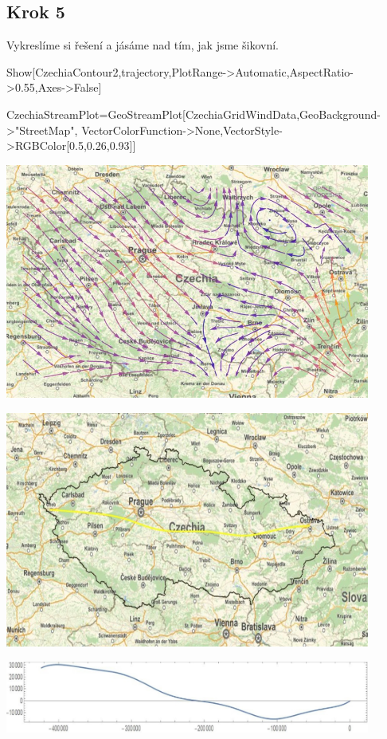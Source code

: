 \documentclass[reqno, a4paper]{amsart}
\begin{document}
\subsection*{Krok 5}
Vykreslíme si řešení a jásáme nad tím, jak jsme šikovní.
\begin{verbatim*}
	Show[CzechiaContour2,trajectory,PlotRange->Automatic,AspectRatio->0.55,Axes->False]
	
	CzechiaStreamPlot=GeoStreamPlot[CzechiaGridWindData,GeoBackground->"StreetMap",
	VectorColorFunction->None,VectorStyle->RGBColor[0.5,0.26,0.93]]
	
\end{verbatim*}
\begin{minipage}{\textwidth}
	\begin{minipage}[b]{0.5\textwidth}
		\centering
		\includegraphics[width=0.9\textwidth]{mapa1}
	\end{minipage}
	\begin{minipage}[b]{0.5\textwidth}
		\centering
		\includegraphics[width=0.9\textwidth]{mapa2}
	\end{minipage}
	\hfill
\end{minipage}
\begin{minipage}{\textwidth}
	\centering
	\begin{minipage}[b]{0.5\textwidth}
		\centering
		\includegraphics[width=0.9\textwidth]{mapa3}
	\end{minipage}
	\hfill
\end{minipage}\\
\end{document}
